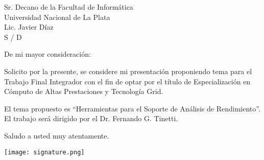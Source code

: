 \documentclass[a4paper]{letter}
\date{C\'ordoba, Junio del 2013}
\begin{document}
\begin{letter}{Sr. Decano de la Facultad de Inform\'atica\\
Universidad Nacional de La Plata\\
Lic. Javier D\'iaz\\
S / D}

\opening{De mi mayor consideraci\'on:}

Solicito por la presente, se considere mi presentaci\'on proponiendo tema para
el Trabajo Final Integrador con el fin de optar por el t\'itulo de
 Especializaci\'on en C\'omputo de Altas Prestaciones y Tecnolog\'ia Grid.

El tema propuesto es ``Herramientas para el Soporte de An\'alisis de
 Rendimiento''. El trabajo ser\'a dirigido por el Dr. Fernando G. Tinetti.

\closing{Saludo a usted muy atentamente.}

\texttt{[image: signature.png]}

\end{letter}
\end{document}
